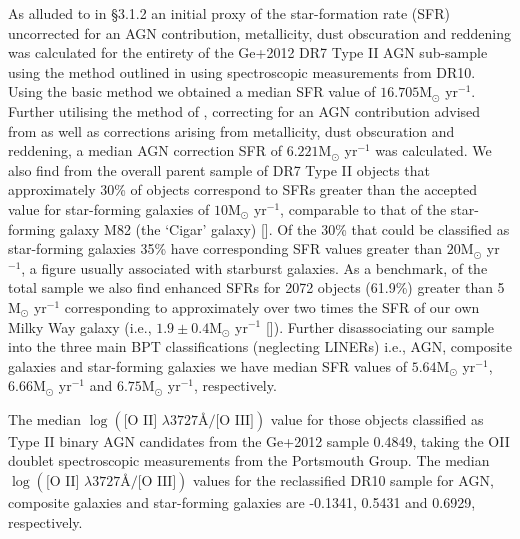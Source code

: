As alluded to in §3.1.2 an initial proxy of the star-formation rate (SFR) uncorrected for an AGN contribution, metallicity, dust obscuration and reddening was calculated for the entirety of the Ge+2012 DR7 Type II AGN sub-sample using the method outlined in \cite{Kennicutt_1998} using spectroscopic measurements from DR10. Using the basic \cite{Kennicutt_1998} method we obtained a median SFR value of $16.705\text{M}_{\odot}$ yr$^{-1}$. Further utilising the method of \cite{Kewley_2004}, correcting for an AGN contribution advised from \cite{2006ApJ...642..702K} as well as corrections arising from metallicity, dust obscuration and reddening, a median AGN correction SFR of $6.221\text{M}_{\odot}$ yr$^{-1}$ was calculated. We also find from the overall parent sample of DR7 Type II objects that approximately 30\% of objects correspond to SFRs greater than the accepted value for star-forming galaxies of $10\text{M}_{\odot}$ yr$^{-1}$, comparable to that of the star-forming galaxy M82 (the ‘Cigar’ galaxy) [\cite{2009ApJ...706.1364F}]. Of the 30\% that could be classified as star-forming galaxies 35\% have corresponding SFR values greater than $20\text{M}_{\odot}$ yr$^{-1}$, a figure usually associated with starburst galaxies. As a benchmark, of the total sample we also find enhanced SFRs for 2072 objects (61.9\%) greater than 5 M$_{\odot}$ yr$^{-1}$ corresponding to approximately over two times the SFR of our own Milky Way galaxy (i.e., $1.9\pm{0.4}\text{M}_{\odot}$ yr$^{-1}$ [\cite{2011AJ....142..197C}]). Further disassociating our sample into the three main BPT classifications (neglecting LINERs) i.e., AGN, composite galaxies and star-forming galaxies we have median SFR values of $5.64\text{M}_{\odot}$ yr$^{-1}$, $6.66\text{M}_{\odot}$ yr$^{-1}$ and $6.75\text{M}_{\odot}$ yr$^{-1}$, respectively. 

The median $\log{(\text{[O II] }{\lambda}3727Å\text{/[O III]})}$ value for those objects classified as Type II binary AGN candidates from the Ge+2012 sample 0.4849, taking the OII doublet spectroscopic measurements from the Portsmouth Group. The median $\log{(\text{[O II] }{\lambda}3727Å\text{/[O III]})}$ values for the reclassified DR10 sample for AGN, composite galaxies and star-forming galaxies are -0.1341, 0.5431 and 0.6929, respectively.       